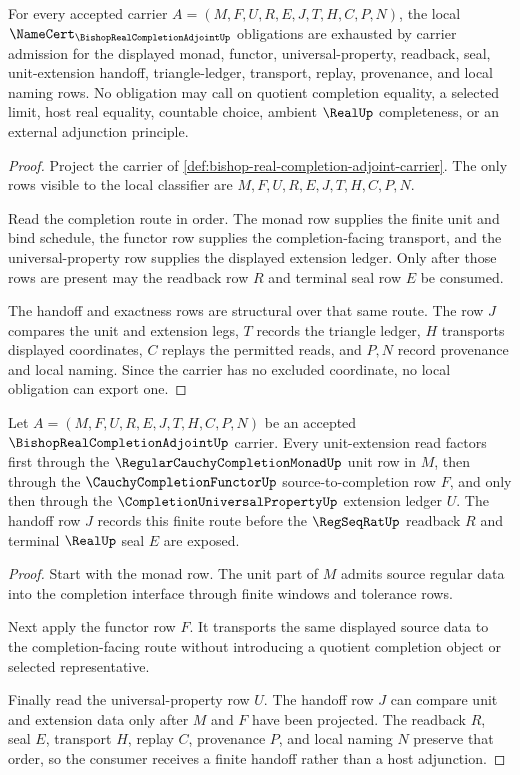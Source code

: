\begin{theorem}
\label{thm:bishop-real-completion-adjoint-namecert-obligations}
For every accepted carrier $A=(M,F,U,R,E,J,T,H,C,P,N)$, the local $\NameCert_{\BishopRealCompletionAdjointUp}$ obligations are exhausted by carrier admission for the displayed monad, functor, universal-property, readback, seal, unit-extension handoff, triangle-ledger, transport, replay, provenance, and local naming rows. No obligation may call on quotient completion equality, a selected limit, host real equality, countable choice, ambient $\RealUp$ completeness, or an external adjunction principle.
\end{theorem}
\begin{proof}
Project the carrier of \autoref{def:bishop-real-completion-adjoint-carrier}. The only rows visible to the local classifier are $M,F,U,R,E,J,T,H,C,P,N$.

Read the completion route in order. The monad row supplies the finite unit and bind schedule, the functor row supplies the completion-facing transport, and the universal-property row supplies the displayed extension ledger. Only after those rows are present may the readback row $R$ and terminal seal row $E$ be consumed.

The handoff and exactness rows are structural over that same route. The row $J$ compares the unit and extension legs, $T$ records the triangle ledger, $H$ transports displayed coordinates, $C$ replays the permitted reads, and $P,N$ record provenance and local naming. Since the carrier has no excluded coordinate, no local obligation can export one.
\end{proof}

\begin{theorem}
\label{thm:bishop-real-completion-adjoint-unit-extension-handoff}
Let $A=(M,F,U,R,E,J,T,H,C,P,N)$ be an accepted $\BishopRealCompletionAdjointUp$ carrier. Every unit-extension read factors first through the $\RegularCauchyCompletionMonadUp$ unit row in $M$, then through the $\CauchyCompletionFunctorUp$ source-to-completion row $F$, and only then through the $\CompletionUniversalPropertyUp$ extension ledger $U$. The handoff row $J$ records this finite route before the $\RegSeqRatUp$ readback $R$ and terminal $\RealUp$ seal $E$ are exposed.
\end{theorem}
\begin{proof}
Start with the monad row. The unit part of $M$ admits source regular data into the completion interface through finite windows and tolerance rows.

Next apply the functor row $F$. It transports the same displayed source data to the completion-facing route without introducing a quotient completion object or selected representative.

Finally read the universal-property row $U$. The handoff row $J$ can compare unit and extension data only after $M$ and $F$ have been projected. The readback $R$, seal $E$, transport $H$, replay $C$, provenance $P$, and local naming $N$ preserve that order, so the consumer receives a finite handoff rather than a host adjunction.
\end{proof}

